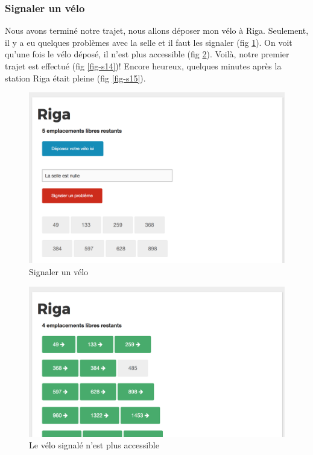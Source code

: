 \documentclass[a4paper]{article}
\begin{document}
    \subsubsection{Signaler un vélo}
    Nous avons terminé notre trajet, nous allons déposer mon vélo à Riga. Seulement, il y a eu quelques problèmes avec la selle et il faut les signaler (fig \ref{fig-s12}). On voit qu'une fois le vélo déposé, il n'est plus accessible (fig \ref{fig-s13}). Voilà, notre premier trajet est effectué (fig \ref{fig-s14})! Encore heureux, quelques minutes après la station Riga était pleine (fig \ref{fig-s15}).
    
    \begin{figure}
	\includegraphics[width=\textwidth]{s12.png}
    \caption{Signaler un vélo}
    \label{fig-s12}
	\end{figure}
    
    \begin{figure}
	\includegraphics[width=\textwidth]{s13.png}
    \caption{Le vélo signalé n'est plus accessible}
    \label{fig-s13}
	\end{figure}
    
\end{document}
